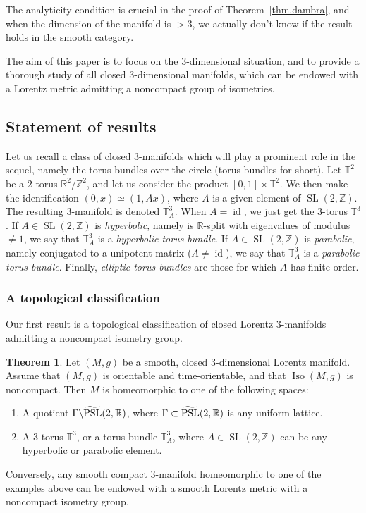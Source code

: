 \documentclass[11pt]{article}
\theoremstyle{definition}
\numberwithin{equation}{section}
\numberwithin{figure}{section}
\numberwithin{table}{section}
\newtheorem{thmx}{Theorem}
\DeclareMathOperator{\Iso}{Iso}
\DeclareMathOperator{\PSL}{PSL}
\DeclareMathOperator{\SL}{SL}
\DeclareMathOperator{\id}{id}
\newcommand*\TT{\mathbb{T}}
\newcommand*\RR{\mathbb{R}}
\newcommand*\ZZ{\mathbb{Z}}
\let\oldtilde\tilde
\renewcommand*\tilde[1]{\mathchoice{\widetilde{#1}}{\widetilde{#1}}{\widetilde{#1}}{\oldtilde{#1}}}
\begin{document}
The analyticity condition is crucial in the proof of Theorem~\ref{thm.dambra}, and when the dimension of the manifold is $> 3$, we actually don't know if the result holds in the smooth category.


The aim of this paper is to focus on the $3$-dimensional situation, and to provide a thorough study of all closed $3$-dimensional manifolds, which can be endowed with a Lorentz metric admitting a noncompact group of isometries.

\subsection{Statement of results}

Let us recall a class of closed $3$-manifolds which will play a prominent role in the sequel, namely the torus bundles over the circle (torus bundles for short). Let $\TT^2$ be a $2$-torus $ \RR^2/ \ZZ^2 $, and let us consider the product $[0,1] \times \TT^2$. We then make the identification $(0,x) \simeq (1,Ax)$, where $A$ is a given element of $ \SL(2,\ZZ)$. The resulting $3$-manifold is denoted $\TT_A^3$. When $A= \id$, we just get the $3$-torus $\TT^3$. If $A \in \SL(2,\ZZ)$ is \emph{hyperbolic}, namely is $\RR$-split with eigenvalues of modulus $\not =1$, we say that $\TT_A^3$ is a \emph{hyperbolic torus bundle}. If $A \in \SL(2,\ZZ)$ is \emph{parabolic}, namely conjugated to a unipotent matrix ($A \not =\id$), we say that $\TT_A^3$ is a \emph{parabolic torus bundle}. Finally, \emph{elliptic torus bundles} are those for which $A$ has finite order.

\subsubsection{A topological classification} Our first result is a topological classification of closed Lorentz $3$-manifolds admitting a noncompact isometry group.

\begin{thmx}\label{thm.topological}
Let $(M,g)$ be a smooth, closed $3$-dimensional Lorentz manifold. Assume that $(M,g)$ is orientable and time-orientable, and that $\Iso(M,g)$ is noncompact. Then $M$ is homeomorphic to one of the following spaces:
\begin{enumerate}
\item \label{list1.1} A quotient $\Gamma \backslash \tilde{\PSL}(2,\RR)$, where $\Gamma \subset \tilde{\PSL}(2,\RR)$ is any uniform lattice.
\item \label{list1.2}A $3$-torus ${\mathbb T}^3$, or a torus bundle ${\mathbb T}_A^3$, where $A \in \SL(2,\ZZ)$ can be any hyperbolic or parabolic element. 
\end{enumerate}
Conversely, any smooth compact $3$-manifold homeomorphic to one of the examples above can be endowed with a smooth Lorentz metric with a noncompact isometry group.
\end{thmx}
\end{document}
